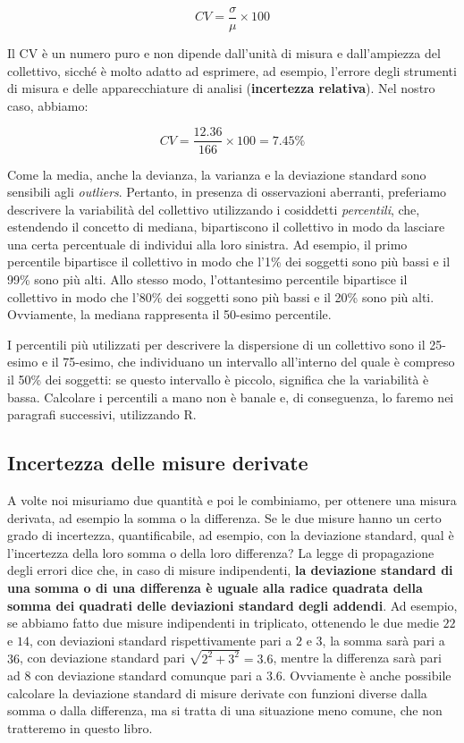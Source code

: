 \documentclass[a4paper,12pt,oneside]{book}
\begin{document}
\[CV = \frac{\sigma }{\mu } \times 100\]

Il CV è un numero puro e non dipende dall'unità di misura e dall'ampiezza del collettivo, sicché è molto adatto ad esprimere, ad esempio, l'errore degli strumenti di misura e delle apparecchiature di analisi (\textbf{incertezza relativa}). Nel nostro caso, abbiamo:

\[CV = \frac{12.36}{166} \times 100 = 7.45 \%\]

Come la media, anche la devianza, la varianza e la deviazione standard sono sensibili agli \emph{outliers}. Pertanto, in presenza di osservazioni aberranti, preferiamo descrivere la variabilità del collettivo utilizzando i cosiddetti \emph{percentili}, che, estendendo il concetto di mediana, bipartiscono il collettivo in modo da lasciare una certa percentuale di individui alla loro sinistra. Ad esempio, il primo percentile bipartisce il collettivo in modo che l'1\% dei soggetti sono più bassi e il 99\% sono più alti. Allo stesso modo, l'ottantesimo percentile bipartisce il collettivo in modo che l'80\% dei soggetti sono più bassi e il 20\% sono più alti. Ovviamente, la mediana rappresenta il 50-esimo percentile.

I percentili più utilizzati per descrivere la dispersione di un collettivo sono il 25-esimo e il 75-esimo, che individuano un intervallo all'interno del quale è compreso il 50\% dei soggetti: se questo intervallo è piccolo, significa che la variabilità è bassa. Calcolare i percentili a mano non è banale e, di conseguenza, lo faremo nei paragrafi successivi, utilizzando R.

\hypertarget{incertezza-delle-misure-derivate}{%
\subsection{Incertezza delle misure derivate}\label{incertezza-delle-misure-derivate}}

A volte noi misuriamo due quantità e poi le combiniamo, per ottenere una misura derivata, ad esempio la somma o la differenza. Se le due misure hanno un certo grado di incertezza, quantificabile, ad esempio, con la deviazione standard, qual è l'incertezza della loro somma o della loro differenza? La legge di propagazione degli errori dice che, in caso di misure indipendenti, \textbf{la deviazione standard di una somma o di una differenza è uguale alla radice quadrata della somma dei quadrati delle deviazioni standard degli addendi}. Ad esempio, se abbiamo fatto due misure indipendenti in triplicato, ottenendo le due medie \(22\) e \(14\), con deviazioni standard rispettivamente pari a \(2\) e \(3\), la somma sarà pari a \(36\), con deviazione standard pari \(\sqrt{2^2 + 3^2} = 3.6\), mentre la differenza sarà pari ad \(8\) con deviazione standard comunque pari a \(3.6\). Ovviamente è anche possibile calcolare la deviazione standard di misure derivate con funzioni diverse dalla somma o dalla differenza, ma si tratta di una situazione meno comune, che non tratteremo in questo libro.
\end{document}
